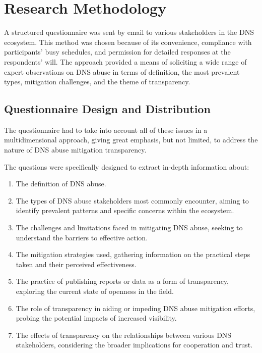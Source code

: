 \chapter{Research Methodology}



A structured questionnaire was sent by email to various stakeholders in the DNS ecosystem. This method was chosen because of its convenience, compliance with participants' busy schedules, and permission for detailed responses at the respondents' will. The approach provided a means of soliciting a wide range of expert observations on DNS abuse in terms of definition, the most prevalent types, mitigation challenges, and the theme of transparency. 



\section{Questionnaire Design and Distribution} 

The questionnaire had to take into account all of these issues in a multidimensional approach, giving great emphasis, but not limited, to address the nature of DNS abuse mitigation transparency.

The questions were specifically designed to extract in-depth information about:


 \begin{enumerate}
 \item The definition of DNS abuse. 
  \item The types of DNS abuse stakeholders most commonly encounter, aiming to identify prevalent patterns and specific concerns within the ecosystem.
  
  \item The challenges and limitations faced in mitigating DNS abuse, seeking to understand the barriers to effective action.
  
  \item The mitigation strategies used, gathering information on the practical steps taken and their perceived effectiveness.
  
  \item The practice of publishing reports or data as a form of transparency, exploring the current state of openness in the field.
  
  \item The role of transparency in aiding or impeding DNS abuse mitigation efforts, probing the potential impacts of increased visibility.
  
  \item  The effects of transparency on the relationships between various DNS stakeholders, considering the broader implications for cooperation and trust.
\end{enumerate}



